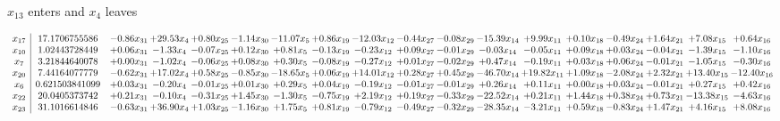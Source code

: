 \documentclass[9pt]{article}
\begin{document}
 $ x_{13} $ enters and $ x_{4} $ leaves 

 \[\begin{array}{c| c c@{\hskip 2pt} c@{\hskip 2pt} c@{\hskip 2pt} c@{\hskip 2pt} c@{\hskip 2pt} c@{\hskip 2pt} c@{\hskip 2pt} c@{\hskip 2pt} c@{\hskip 2pt} c@{\hskip 2pt} c@{\hskip 2pt} c@{\hskip 2pt} c@{\hskip 2pt} c@{\hskip 2pt} c@{\hskip 2pt} c@{\hskip 2pt} }
 x_{17}   &  17.1706755586 & -0.86 x_{31} & + 29.53 x_{4} & +  0.80 x_{25} & -1.14 x_{30} & -11.07 x_{5} & +  0.86 x_{19} & -12.03 x_{12} & -0.44 x_{27} & -0.08 x_{29} & -15.39 x_{14} & +  9.99 x_{11} & +  0.10 x_{18} & -0.49 x_{24} & +  1.64 x_{21} & +  7.08 x_{15} & +  0.64 x_{16}\\
 x_{10}   &  1.02443728449 & +  0.06 x_{31} & -1.33 x_{4} & -0.07 x_{25} & +  0.12 x_{30} & +  0.81 x_{5} & -0.13 x_{19} & -0.23 x_{12} & +  0.09 x_{27} & -0.01 x_{29} & -0.03 x_{14} & -0.05 x_{11} & +  0.09 x_{18} & +  0.03 x_{24} & -0.04 x_{21} & -1.39 x_{15} & -1.10 x_{16}\\
 x_{7}   &  3.21844640078 & +  0.00 x_{31} & -1.02 x_{4} & -0.06 x_{25} & +  0.08 x_{30} & +  0.30 x_{5} & -0.08 x_{19} & -0.27 x_{12} & +  0.01 x_{27} & -0.02 x_{29} & +  0.47 x_{14} & -0.19 x_{11} & +  0.03 x_{18} & +  0.06 x_{24} & -0.01 x_{21} & -1.05 x_{15} & -0.30 x_{16}\\
 x_{20}   &  7.44164077779 & -0.62 x_{31} & + 17.02 x_{4} & +  0.58 x_{25} & -0.85 x_{30} & -18.65 x_{5} & +  0.06 x_{19} & + 14.01 x_{12} & +  0.28 x_{27} & +  0.45 x_{29} & -46.70 x_{14} & + 19.82 x_{11} & +  1.09 x_{18} & -2.08 x_{24} & +  2.32 x_{21} & + 13.40 x_{15} & -12.40 x_{16}\\
 x_{6}   &  0.621503841099 & +  0.03 x_{31} & -0.20 x_{4} & -0.01 x_{25} & +  0.01 x_{30} & +  0.29 x_{5} & +  0.04 x_{19} & -0.19 x_{12} & -0.01 x_{27} & -0.01 x_{29} & +  0.26 x_{14} & +  0.11 x_{11} & +  0.00 x_{18} & +  0.03 x_{24} & -0.01 x_{21} & +  0.27 x_{15} & +  0.42 x_{16}\\
 x_{22}   &  20.0405373742 & +  0.21 x_{31} & -0.10 x_{4} & -0.31 x_{25} & +  1.45 x_{30} & -1.30 x_{5} & -0.75 x_{19} & +  2.19 x_{12} & +  0.19 x_{27} & -0.33 x_{29} & -22.52 x_{14} & +  0.21 x_{11} & +  1.44 x_{18} & +  0.38 x_{24} & +  0.73 x_{21} & -13.38 x_{15} & -4.63 x_{16}\\
 x_{23}   &  31.1016614846 & -0.63 x_{31} & + 36.90 x_{4} & +  1.03 x_{25} & -1.16 x_{30} & +  1.75 x_{5} & +  0.81 x_{19} & -0.79 x_{12} & -0.49 x_{27} & -0.32 x_{29} & -28.35 x_{14} & -3.21 x_{11} & +  0.59 x_{18} & -0.83 x_{24} & +  1.47 x_{21} & +  4.16 x_{15} & +  8.08 x_{16}\\

\end{array}\]
\end{document}
